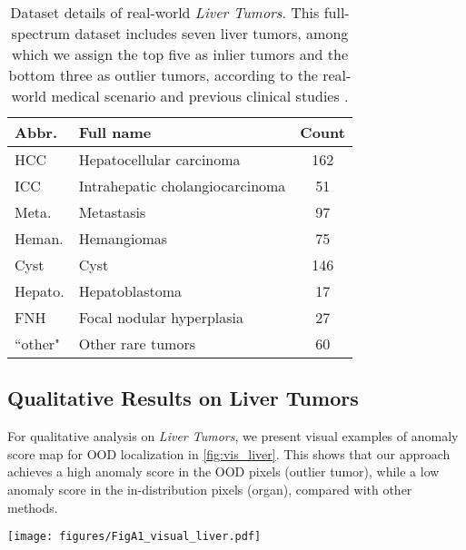 \documentclass[10pt,twocolumn,letterpaper]{article}
\begin{document}
\begin{table}[ht]
    \centering
    \begin{tabular}{l|l|c}
    \hline
    Abbr. & Full name & Count\\
    \hline
     HCC & Hepatocellular carcinoma & 162\\
     ICC & Intrahepatic cholangiocarcinoma & 51\\
     Meta. & Metastasis & 97\\
     Heman. & Hemangiomas & 75\\
     Cyst & Cyst & 146\\
     \hline 
     Hepato. & Hepatoblastoma & 17\\
     FNH & Focal nodular hyperplasia & 27 \\
     ``other" & Other rare tumors & 60\\
      \hline
    \end{tabular}
    \caption{Dataset details of real-world \textit{Liver Tumors}. This full-spectrum dataset includes seven liver tumors, among which we assign the top five as inlier tumors and the bottom three as outlier tumors, according to the real-world medical scenario and previous clinical studies \cite{yasaka2018deep}. }
    \label{tab:full_name_liver}
\end{table}


\subsection{Qualitative Results on Liver Tumors}
For qualitative analysis on \textit{Liver Tumors}, we present visual examples of anomaly score map for OOD localization in \cref{fig:vis_liver}. This shows that our approach achieves a high anomaly score in the OOD pixels (outlier tumor), while a low anomaly score in the in-distribution pixels (organ), compared with other methods.
\setcounter{figure}{0} 
\begin{figure*}[ht]
  \centering
   \texttt{[image: figures/FigA1\_visual\_liver.pdf]}
   \vspace{-0.2cm}
   \caption{Visualization results of anomaly score map for OOD localization on \textit{Liver Tumors}: (a) 2D slices of the CT image, (b) ground truth annotation (red: liver, blue: outlier tumor), (c) MSP~\cite{hendrycks2016baseline}, (d) MaxLogit~\cite{hendrycks2019scaling}, (e) SML~\cite{jung2021standardized} and (f) Ours. The grayscale level indicates the anomaly score. Our method reaches a high anomaly score in the OOD pixels (outlier tumor), while a low anomaly score in the in-distribution pixels (organ).}
   \vspace{-0.2cm}
   \label{fig:vis_liver}
\end{figure*}
\end{document}

